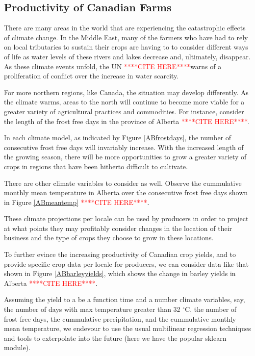\documentclass[11pt]{article}
\numberwithin{equation}{section}
\numberwithin{figure}{section}
\newcommand{\rred}[1]{\textcolor{red}{#1}}
\newcommand{\ccite}{\rred{****CITE HERE****}}
\begin{document}
\subsection{Productivity of Canadian Farms}\label{productivity}

There are many areas in the world that are experiencing the catastrophic effects of climate change. In the Middle East, many of the farmers who have had to rely on local tributaries to sustain their crops are having to to consider different ways of life as water levels of these rivers and lakes decrease and, ultimately, disappear. As these climate events unfold, the UN \ccite warns of a proliferation of conflict over the increase in water scarcity.

For more northern regions, like Canada, the situation may develop differently. As the climate warms, areas to the north will continue to become more viable for a greater variety of agricultural practices and commodities. For instance, consider the length of the frost free days in the province of Alberta \ccite.

In each climate model, as indicated by Figure \ref{ABfrostdays}, the number of consecutive frost free days will invariably increase. With the increased length of the growing season, there will be more opportunities to grow a greater variety of crops in regions that have been hitherto difficult to cultivate.

There are other climate variables to consider as well. Observe the cummulative monthly mean temperature in Alberta over the consecutive frost free days shown in Figure \ref{ABmeantemp} \ccite.

These climate projections per locale can be used by producers in order to project at what points they may profitably consider changes in the location of their business and the type of crops they choose to grow in these locations.

To further evince the increasing productivity of Canadian crop yields, and to provide specific crop data per locale for producers, we can consider data like that shown in Figure \ref{ABbarleyyields}, which shows the change in barley yields in Alberta \ccite. 

Assuming the yield to a be a function time and a number climate variables, say, the number of days with max temperature greater than 32 $^\circ$C, the number of frost free days, the cummulative precipitation, and the cummulative monthly mean temperature, we endevour to use the usual multilinear regression techniques and tools to exterpolate into the future (here we have the popular sklearn module).
\end{document}
